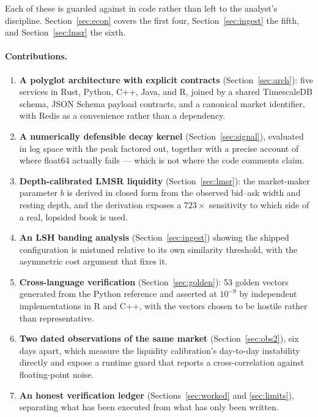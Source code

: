 \documentclass[11pt]{article}
\begin{document}
Each of these is guarded against in code rather than left to the analyst's
discipline. Section~\ref{sec:econ} covers the first four,
Section~\ref{sec:ingest} the fifth, and Section~\ref{sec:lmsr} the sixth.

\paragraph{Contributions.}
\begin{enumerate}\itemsep2pt
\item \textbf{A polyglot architecture with explicit contracts}
      (Section~\ref{sec:arch}): five services in Rust, Python, C++, Java, and R,
      joined by a shared TimescaleDB schema, JSON Schema payload contracts, and
      a canonical market identifier, with Redis as a convenience rather than a
      dependency.
\item \textbf{A numerically defensible decay kernel}
      (Section~\ref{sec:signal}), evaluated in log space with the peak factored
      out, together with a precise account of where float64 actually fails ---
      which is not where the code comments claim.
\item \textbf{Depth-calibrated LMSR liquidity} (Section~\ref{sec:lmsr}): the
      market-maker parameter $b$ is derived in closed form from the observed
      bid--ask width and resting depth, and the derivation exposes a $723\times$
      sensitivity to which side of a real, lopsided book is used.
\item \textbf{An LSH banding analysis} (Section~\ref{sec:ingest}) showing the
      shipped configuration is mistuned relative to its own similarity
      threshold, with the asymmetric cost argument that fixes it.
\item \textbf{Cross-language verification} (Section~\ref{sec:golden}): 53 golden
      vectors generated from the Python reference and asserted at $10^{-9}$ by
      independent implementations in R and C++, with the vectors chosen to be
      hostile rather than representative.
\item \textbf{Two dated observations of the same market}
      (Section~\ref{sec:obs2}), six days apart, which measure the liquidity
      calibration's day-to-day instability directly and expose a runtime
      guard that reports a cross-correlation against floating-point noise.
\item \textbf{An honest verification ledger} (Sections~\ref{sec:worked} and
      \ref{sec:limits}), separating what has been executed from what has only
      been written.
\end{enumerate}
\end{document}
